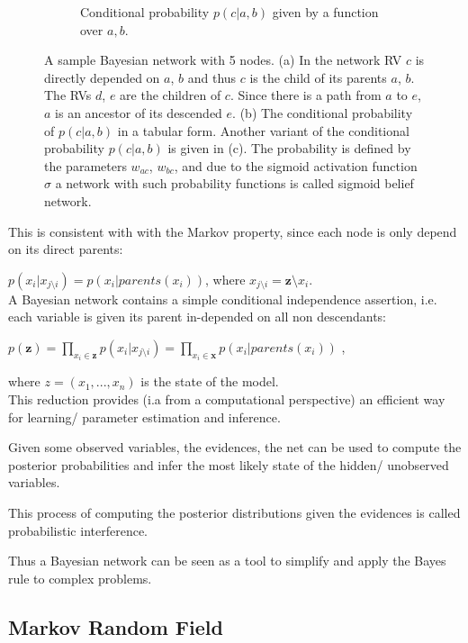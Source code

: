 \begin{figure}
\begin{subfigure}[t]{.33\textwidth}
  		\caption{Conditional probability $p(c |a , b)$ given by a function over $a,b$.}
  		\label{fig:bayesnet}
	\end{subfigure}
	\caption{A sample Bayesian network with 5 nodes. (a) In the network RV $c$ is directly depended on $a$, $b$ and thus $c$ is the child of its parents $a$, $b$. The RVs $d$, $e$ are the children of $c$. Since there is a path from $a$ to $e$, $a$ is an ancestor of its descended $e$. (b) The conditional probability of $p(c |a , b)$ in a tabular form. Another variant of the conditional probability $p(c |a , b)$ is given in (c). The probability is defined by the parameters $w_{ac}$, $w_{bc}$, and due to the sigmoid activation function $\sigma$ a network with such probability functions is called sigmoid belief network.}
	\label{fig:test}
\end{figure}

This is consistent with with the Markov property, since each node is only depend on its direct parents:

$p(x_i | x_{j \setminus i}) = p(x_i | parents(x_i) )$, where $x_{j \setminus i} = \textbf{z} \setminus x_i$.
\\

A Bayesian network contains a simple conditional independence assertion, i.e. each variable is given its parent in-depended on all non descendants:

$ p(\textbf{z}) = \prod_{x_i \in \textbf{z}} p(x_i | x_{j \setminus i}) = \prod_{x_i \in \textbf{x}} p(x_i | parents(x_i) ) $ ,

where $z = (x_1, ... , x_n)$ is the state of the model. 
\\

This reduction provides (i.a from a computational perspective) an efficient way for learning/ parameter estimation and inference.

Given some observed variables, the evidences, the net can be used to compute the posterior probabilities and infer the most likely state of the hidden/ unobserved variables.

This process of computing the posterior distributions given the evidences is called probabilistic interference.

Thus a Bayesian network can be seen as a tool to simplify and apply the Bayes rule to complex problems.   

\subsection{Markov Random Field}

